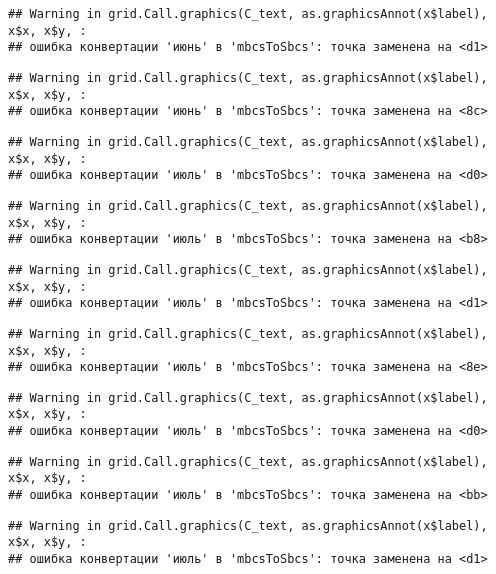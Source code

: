 \documentclass[
]{article}
\begin{document}
\begin{verbatim}
## Warning in grid.Call.graphics(C_text, as.graphicsAnnot(x$label), x$x, x$y, :
## ошибка конвертации 'июнь' в 'mbcsToSbcs': точка заменена на <d1>
\end{verbatim}

\begin{verbatim}
## Warning in grid.Call.graphics(C_text, as.graphicsAnnot(x$label), x$x, x$y, :
## ошибка конвертации 'июнь' в 'mbcsToSbcs': точка заменена на <8c>
\end{verbatim}

\begin{verbatim}
## Warning in grid.Call.graphics(C_text, as.graphicsAnnot(x$label), x$x, x$y, :
## ошибка конвертации 'июль' в 'mbcsToSbcs': точка заменена на <d0>
\end{verbatim}

\begin{verbatim}
## Warning in grid.Call.graphics(C_text, as.graphicsAnnot(x$label), x$x, x$y, :
## ошибка конвертации 'июль' в 'mbcsToSbcs': точка заменена на <b8>
\end{verbatim}

\begin{verbatim}
## Warning in grid.Call.graphics(C_text, as.graphicsAnnot(x$label), x$x, x$y, :
## ошибка конвертации 'июль' в 'mbcsToSbcs': точка заменена на <d1>
\end{verbatim}

\begin{verbatim}
## Warning in grid.Call.graphics(C_text, as.graphicsAnnot(x$label), x$x, x$y, :
## ошибка конвертации 'июль' в 'mbcsToSbcs': точка заменена на <8e>
\end{verbatim}

\begin{verbatim}
## Warning in grid.Call.graphics(C_text, as.graphicsAnnot(x$label), x$x, x$y, :
## ошибка конвертации 'июль' в 'mbcsToSbcs': точка заменена на <d0>
\end{verbatim}

\begin{verbatim}
## Warning in grid.Call.graphics(C_text, as.graphicsAnnot(x$label), x$x, x$y, :
## ошибка конвертации 'июль' в 'mbcsToSbcs': точка заменена на <bb>
\end{verbatim}

\begin{verbatim}
## Warning in grid.Call.graphics(C_text, as.graphicsAnnot(x$label), x$x, x$y, :
## ошибка конвертации 'июль' в 'mbcsToSbcs': точка заменена на <d1>
\end{verbatim}
\end{document}
